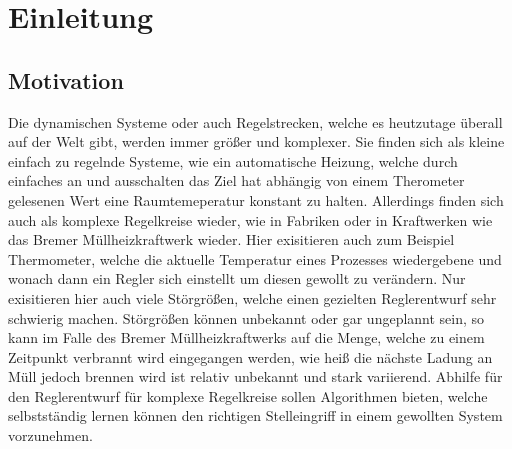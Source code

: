 \documentclass[]{iat}
\begin{document}
\graphicspath{{./project_graphics/}}



\tableofcontents

\newpage

\chapter{Einleitung} \label{sec:einleitung}
\section{Motivation} \label{sec:motivation}
Die dynamischen Systeme oder auch Regelstrecken, welche es heutzutage überall auf der Welt gibt, werden immer größer und komplexer. Sie finden sich als kleine einfach zu regelnde Systeme, wie ein automatische Heizung, welche durch einfaches an und ausschalten das Ziel hat abhängig von einem Therometer gelesenen Wert eine Raumtemeperatur konstant zu halten. Allerdings finden sich auch als komplexe Regelkreise wieder, wie in Fabriken oder in Kraftwerken wie das Bremer Müllheizkraftwerk wieder. Hier exisitieren auch zum Beispiel Thermometer, welche die aktuelle Temperatur eines Prozesses wiedergebene und wonach dann ein Regler sich einstellt um diesen gewollt zu verändern. Nur exisitieren hier auch viele Störgrößen, welche einen gezielten Reglerentwurf sehr schwierig machen. Störgrößen können unbekannt oder gar ungeplannt sein, so kann im Falle des Bremer Müllheizkraftwerks auf die Menge, welche zu einem Zeitpunkt verbrannt wird eingegangen werden, wie heiß die nächste Ladung an Müll jedoch brennen wird ist relativ unbekannt und stark variierend. Abhilfe für den Reglerentwurf für komplexe Regelkreise sollen Algorithmen bieten, welche selbstständig lernen können den richtigen Stelleingriff in einem gewollten System vorzunehmen.
\end{document}
